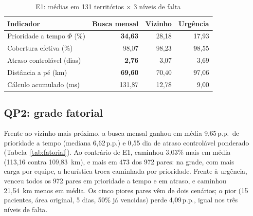 \documentclass[conference,a4paper]{IEEEtran}
\newcommand{\pp}{\,p.p.}
\begin{document}
\begin{table}[t]
\centering
\caption{E1: médias em 131 territórios $\times$ 3 níveis de falta}
\label{tab:cidade}
\footnotesize
\begin{tabular}{@{}lrrr@{}}
\toprule
Indicador & Busca mensal & Vizinho & Urgência \\
\midrule
Prioridade a tempo $\Phi$ (\%) & \textbf{34,63} & 28,18 & 17,93 \\
Cobertura efetiva (\%) & 98,07 & 98,23 & 98,55 \\
Atraso controlável (dias) & \textbf{2,76} & 3,07 & 3,69 \\
Distância a pé (km) & \textbf{69,60} & 70,40 & 97,06 \\
Cálculo acumulado (ms) & 131,87 & 12,78 & 9,00 \\
\bottomrule
\end{tabular}
\end{table}

\subsection{QP2: grade fatorial}

Frente ao vizinho mais próximo, a busca mensal ganhou em média 9,65\pp\ de prioridade a tempo (mediana 6,62\pp) e 0,55 dia de atraso controlável ponderado (Tabela~\ref{tab:fatorial}). Ao contrário de E1, caminhou 3,03\% mais em média (113,16 contra 109,83~km), e mais em 473 dos 972 pares: na grade, com mais carga por equipe, a heurística troca caminhada por prioridade. Frente à urgência, venceu todos os 972 pares em prioridade a tempo e em atraso, e caminhou 21,54~km menos em média. Os cinco piores pares vêm de dois cenários; o pior (15 pacientes, área original, 5 dias, 50\% já vencidas) perde 4,09\pp, igual nos três níveis de falta.
\end{document}
